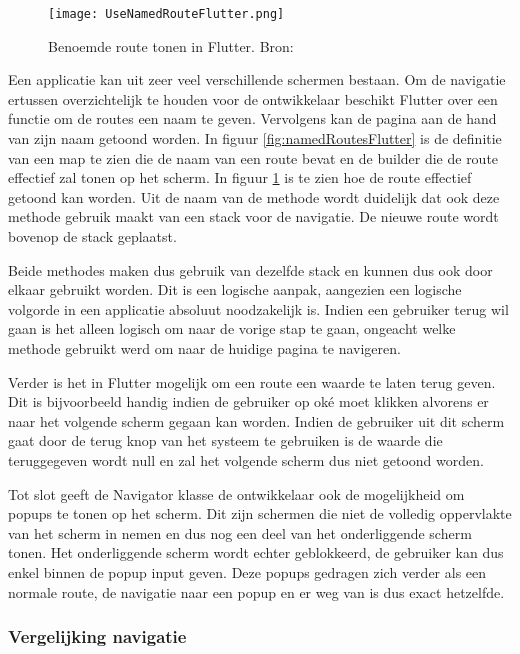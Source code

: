 \begin{figure}
    \texttt{[image: UseNamedRouteFlutter.png]}
    \caption{Benoemde route tonen in Flutter. Bron: \textcite{Flutter.dev2020}}
    \label{fig:useNamedRoutesFlutter}
\end{figure}

Een applicatie kan uit zeer veel verschillende schermen bestaan. Om de navigatie ertussen overzichtelijk te houden voor de ontwikkelaar beschikt Flutter over een functie om de routes een naam te geven. Vervolgens kan de pagina aan de hand van zijn naam getoond worden. In figuur \ref{fig:namedRoutesFlutter} is de definitie van een map te zien die de naam van een route bevat en de builder die de route effectief zal tonen op het scherm. In figuur \ref{fig:useNamedRoutesFlutter} is te zien hoe de route effectief getoond kan worden. Uit de naam van de methode wordt duidelijk dat ook deze methode gebruik maakt van een stack voor de navigatie. De nieuwe route wordt bovenop de stack geplaatst.

Beide methodes maken dus gebruik van dezelfde stack en kunnen dus ook door elkaar gebruikt worden. Dit is een logische aanpak, aangezien een logische volgorde in een applicatie absoluut noodzakelijk is. Indien een gebruiker terug wil gaan is het alleen logisch om naar de vorige stap te gaan, ongeacht welke methode gebruikt werd om naar de huidige pagina te navigeren. 

Verder is het in Flutter mogelijk om een route een waarde te laten terug geven. Dit is bijvoorbeeld handig indien de gebruiker op oké moet klikken alvorens er naar het volgende scherm gegaan kan worden. Indien de gebruiker uit dit scherm gaat door de terug knop van het systeem te gebruiken is de waarde die teruggegeven wordt null en zal het volgende scherm dus niet getoond worden.

Tot slot geeft de Navigator klasse de ontwikkelaar ook de mogelijkheid om popups te tonen op het scherm. Dit zijn schermen die niet de volledig oppervlakte van het scherm in nemen en dus nog een deel van het onderliggende scherm tonen. Het onderliggende scherm wordt echter geblokkeerd, de gebruiker kan dus enkel binnen de popup input geven. Deze popups gedragen zich verder als een normale route, de navigatie naar een popup en er weg van is dus exact hetzelfde.

\subsubsection{Vergelijking navigatie}
\label{subsubsec:vglNavigatie}

